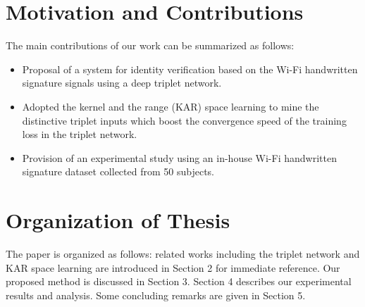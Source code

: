 \newpage
\section{Motivation and Contributions}
The main contributions of our work can be summarized as follows:
\begin{itemize}
\item Proposal of a system for identity verification based on the Wi-Fi handwritten signature signals using a deep triplet network.
\item Adopted the kernel and the range (KAR) space learning to mine the distinctive triplet inputs which boost the convergence speed of the training loss in the triplet network.
\item Provision of an experimental study using an in-house Wi-Fi handwritten signature dataset collected from 50 subjects.
\end{itemize}

\section{Organization of Thesis}
The paper is organized as follows: related works including the triplet network and KAR space learning are introduced in Section 2 for immediate reference. Our proposed method is discussed in Section 3. Section 4 describes our experimental results and analysis. Some concluding remarks are given in Section 5.